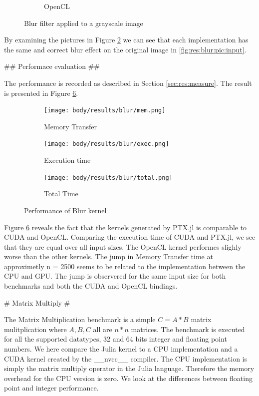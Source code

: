 \begin{markdown}
\begin{figure}[H]
\begin{subfigure}{.49\textwidth}
    \caption{OpenCL}
    \label{fig:res:blur:pic:opencl}
  \end{subfigure}
  \caption{Blur filter applied to a grayscale image}
  \label{fig:res:blur:pic}
\end{figure}

By examining the pictures in Figure \ref{fig:res:blur:pic} we can see
that each implementation has the same and correct blur effect on the
original image in \ref{fig:res:blur:pic:input}.

## Performace evaluation ##
\label{sec:res:blur:perf}

The performance is recorded as described in Section
\ref{sec:res:measure}. The result is presented in Figure \ref{fig:res:blur}.

\begin{figure}[H]
  \centering
  \begin{subfigure}{.33\textwidth}
    \centering
    \texttt{[image: body/results/blur/mem.png]}
    \caption{Memory Transfer}
    \label{fig:res:blur:int32:mem}
  \end{subfigure}%
  \begin{subfigure}{.33\textwidth}
    \centering
    \texttt{[image: body/results/blur/exec.png]}
    \caption{Execution time}
    \label{fig:res:blur:int32:exec}
  \end{subfigure}%
  \begin{subfigure}{.33\textwidth}
    \centering
    \texttt{[image: body/results/blur/total.png]}
    \caption{Total Time}
    \label{fig:res:blur:int32:tot}
  \end{subfigure}%
  \caption{Performance of Blur kernel}
  \label{fig:res:blur}
\end{figure}

Figure \ref{fig:res:blur} reveals the fact that the kernels generated
by PTX.jl is comparable to CUDA and OpenCL. Comparing the execution
time of CUDA and PTX.jl, we see that they are equal over all input
sizes. The OpenCL kernel performes slighly worse than the other
kernels. The jump in Memory Transfer time at approximetly n = 2500
seems to be related to the implementation between the CPU and GPU. The
jump is observered for the same input size for both benchmarks and
both the CUDA and OpenCL bindings.

# Matrix Multiply #
\label{sec:res:mm}

The Matrix Multiplication benchmark is a simple $C = A * B$ matrix
mulitplication where $A, B, C$ all are $n*n$ matrices. The benchmark
is executed for all the supported datatypes, 32 and 64 bits integer
and floating point numbers. We here compare the Julia kernel to a CPU
implementation and a CUDA kernel created by the __nvcc__ compiler.
The CPU implementation is simply the matrix multiply operator in the
Julia language. Therefore the memory overhead for the CPU version is
zero. We look at the differences between floating point and integer
performance.


\end{markdown}
